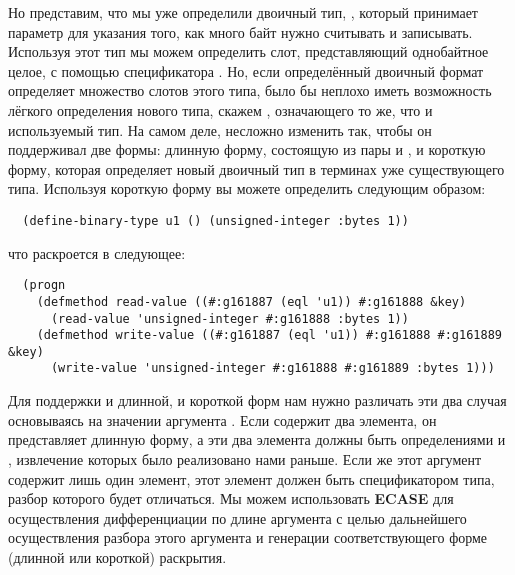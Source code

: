 Но представим, что мы уже определили двоичный тип, , который
принимает параметр  для указания того, как много байт нужно считывать и
записывать. Используя этот тип мы можем определить слот, представляющий однобайтное целое,
с помощью спецификатора . Но, если определённый двоичный
формат определяет множество слотов этого типа, было бы неплохо иметь возможность лёгкого
определения нового типа, скажем , означающего то же, что и используемый тип. На
самом деле, несложно изменить  так, чтобы он поддерживал две
формы: длинную форму, состоящую из пары  и , и короткую форму,
которая определяет новый двоичный тип в терминах уже существующего типа. Используя
короткую форму  вы можете определить  следующим образом:

\begin{lstlisting}
  (define-binary-type u1 () (unsigned-integer :bytes 1))
\end{lstlisting}

что раскроется в следующее:

\begin{lstlisting}
  (progn
    (defmethod read-value ((#:g161887 (eql 'u1)) #:g161888 &key)
      (read-value 'unsigned-integer #:g161888 :bytes 1))
    (defmethod write-value ((#:g161887 (eql 'u1)) #:g161888 #:g161889 &key)
      (write-value 'unsigned-integer #:g161888 #:g161889 :bytes 1)))
\end{lstlisting}

Для поддержки и длинной, и короткой форм  нам нужно различать эти
два случая основываясь на значении аргумента . Если  содержит два
элемента, он представляет длинную форму, а эти два элемента должны быть определениями
 и , извлечение которых было реализовано нами раньше. Если же
этот аргумент содержит лишь один элемент, этот элемент должен быть спецификатором типа,
разбор которого будет отличаться. Мы можем использовать \textbf{ECASE} для осуществления
дифференциации по длине аргумента  с целью дальнейшего осуществления разбора
этого аргумента и генерации соответствующего форме (длинной или короткой) раскрытия.

